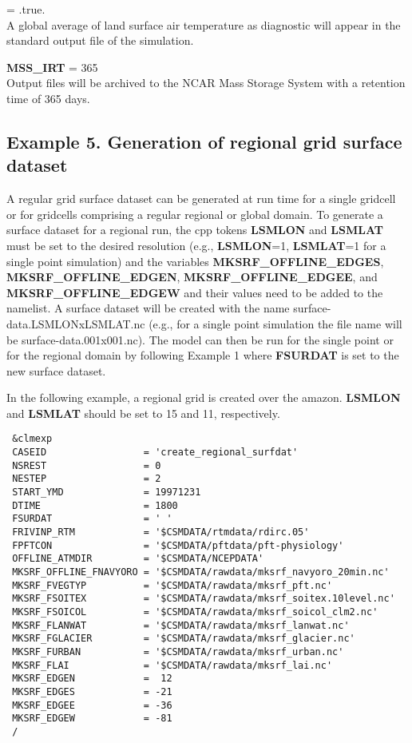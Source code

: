 \medskip {} = .true. \\ 
A global average of land surface air temperature as diagnostic will
appear in the standard output file of the simulation.

\medskip \noindent 
{\bf MSS\_IRT} = 365 \\ 
Output files will be archived to the NCAR Mass Storage System with a
retention time of 365 days.

\subsection {Example 5. Generation of regional grid surface dataset}

\medskip \noindent  
A regular grid surface dataset can be generated at run time for a
single gridcell or for gridcells comprising a regular regional or
global domain. To generate a surface dataset for a regional run, the
cpp tokens {\bf LSMLON} and {\bf LSMLAT} must be set to the desired
resolution (e.g., {\bf LSMLON}=1, {\bf LSMLAT}=1 for a single point
simulation) and the variables {\bf MKSRF\_OFFLINE\_EDGES}, {\bf
MKSRF\_OFFLINE\_EDGEN}, {\bf MKSRF\_OFFLINE\_EDGEE}, and {\bf
MKSRF\_OFFLINE\_EDGEW} and their values need to be added to the
namelist.  A surface dataset will be created with the name
surface-data.LSMLONxLSMLAT.nc (e.g., for a single point simulation the
file name will be surface-data.001x001.nc). The model can then be run
for the single point or for the regional domain by following Example 1
where {\bf FSURDAT} is set to the new surface dataset. 

In the following example, a regional grid is created over the
amazon. {\bf LSMLON} and {\bf LSMLAT} should be set to 15 and 11,
respectively.

\begin{verbatim}
 &clmexp     
 CASEID                 = 'create_regional_surfdat' 
 NSREST                 = 0 
 NESTEP                 = 2 
 START_YMD              = 19971231 
 DTIME                  = 1800 
 FSURDAT                = ' '   
 FRIVINP_RTM            = '$CSMDATA/rtmdata/rdirc.05' 
 FPFTCON                = '$CSMDATA/pftdata/pft-physiology' 
 OFFLINE_ATMDIR         = '$CSMDATA/NCEPDATA' 
 MKSRF_OFFLINE_FNAVYORO = '$CSMDATA/rawdata/mksrf_navyoro_20min.nc' 
 MKSRF_FVEGTYP          = '$CSMDATA/rawdata/mksrf_pft.nc' 
 MKSRF_FSOITEX          = '$CSMDATA/rawdata/mksrf_soitex.10level.nc' 
 MKSRF_FSOICOL          = '$CSMDATA/rawdata/mksrf_soicol_clm2.nc' 
 MKSRF_FLANWAT          = '$CSMDATA/rawdata/mksrf_lanwat.nc' 
 MKSRF_FGLACIER         = '$CSMDATA/rawdata/mksrf_glacier.nc' 
 MKSRF_FURBAN           = '$CSMDATA/rawdata/mksrf_urban.nc' 
 MKSRF_FLAI             = '$CSMDATA/rawdata/mksrf_lai.nc' 
 MKSRF_EDGEN            =  12 
 MKSRF_EDGES            = -21 
 MKSRF_EDGEE            = -36 
 MKSRF_EDGEW            = -81 
 /   
\end{verbatim}

